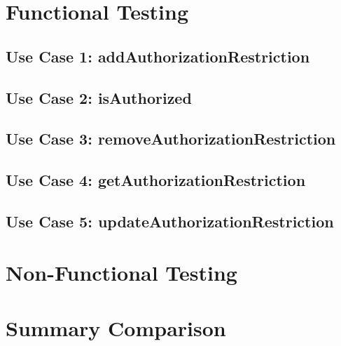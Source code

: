 \documentclass[12pt]{article}
\begin{document}

\tableofcontents
\newpage
\section{Functional Testing}
\subsection{Use Case 1: addAuthorizationRestriction}

\newpage
\subsection{Use Case 2: isAuthorized}

\newpage
\subsection{Use Case 3: removeAuthorizationRestriction}

\newpage
\subsection{Use Case 4: getAuthorizationRestriction}

\newpage
\subsection{Use Case 5: updateAuthorizationRestriction}

\newpage
\section{Non-Functional Testing}

\newpage
\section{Summary Comparison}

\end{document}
